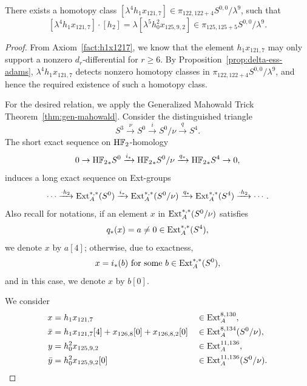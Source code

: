 \begin{lemma} \label{lem:nuext125}
    There exists a homotopy class $[\lambda^4 h_1 x_{121,7}] \in \pi_{122,122+4}S^{0,0}/\lambda^9$, such that 
    $$[\lambda^4 h_1 x_{121,7}] \cdot [h_2] = \lambda [\lambda^5 h_0^2 x_{125,9,2}] \in \pi_{125,125+5} S^{0,0}/\lambda^9.$$
\end{lemma}

\begin{proof}
    From Axiom~\ref{fact:h1x1217}, we know that the element $h_1x_{121,7}$ may only support a nonzero $d_r$-differential for $r \ge 6$. By Proposition~\ref{prop:delta-ess-adams}, $\lambda^4 h_1 x_{121,7}$ detects nonzero homotopy classes in $\pi_{122,122+4}S^{0,0}/\lambda^9$, and hence the required existence of such a homotopy class.

    For the desired relation, we apply the Generalized Mahowald Trick Theorem~\ref{thm:gen-mahowald}. Consider the distinguished triangle
        $$S^3 \xrightarrow{\nu} S^0 \xrightarrow{i} S^0/\nu \xrightarrow{q} S^4.$$
The short exact sequence on $\mathrm{H}{\mathbb F}_2$-homology
$$0 \to {\mathrm{H}{\mathbb F}_2}_*S^0 \xrightarrow{i_*} {\mathrm{H}{\mathbb F}_2}_*S^0/\nu \xrightarrow{q_*} {\mathrm{H}{\mathbb F}_2}_*S^4 \to 0,$$
induces a long exact sequence on Ext-groups
$$\cdots \xrightarrow{\cdot h_2} {\mathrm{Ext}}_A^{*,*}(S^0) \xrightarrow{i_*} {\mathrm{Ext}}_A^{*,*}(S^0/\nu) \xrightarrow{q_*} {\mathrm{Ext}}_A^{*,*}(S^4) \xrightarrow{\cdot h_2} \cdots.$$
Also recall for notations, if an element $x$ in ${\mathrm{Ext}}_A^{*,*}(S^0/\nu)$ satisfies 
$$q_*(x) = a \neq 0 \in \mathrm{Ext}_A^{*,*}(S^4),$$ 
we denote $x$ by $a[4]$; otherwise, due to exactness, 
$$x = i_*(b) \ \text{for some} \ b \in \Ext_A^{*,*}(S^0),$$
and in this case, we denote $x$ by $b[0]$. 

We consider
\begin{align*}
x & = h_1 x_{121,7} && \in \mathrm{Ext}_A^{8,130},\\
\bar{x} & =h_1 x_{121,7} [4] + x_{126,8}[0] + x_{126,8,2}[0] && \in \mathrm{Ext}_A^{8,134}(S^0/\nu), \\
y & =h_0^2 x_{125,9,2} && \in \mathrm{Ext}_A^{11,136} ,\\
        \bar{y} & =h_0^2 x_{125,9,2}[0] && \in \mathrm{Ext}_A^{11,136}(S^0/\nu). 
  \end{align*}      


\end{proof}
